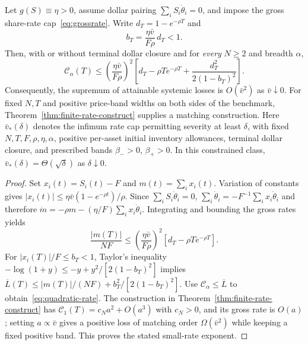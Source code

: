 \documentclass[review,hidelinks,onefignum,onetabnum]{siamonline250211}
\begin{document}
\begin{theorem}\label{thm:quadratic-rate}
Let $g(S)\equiv\eta>0$, assume dollar pairing $\sum_iS_i\dot\theta_i=0$, and impose the gross share-rate cap~\eqref{eq:grossrate}. Write $d_T=1-e^{-\rho T}$ and
\begin{equation}\label{eq:bsmall}
 b_T=\frac{\eta\bar v}{F\rho}\,d_T<1.
\end{equation}
Then, with or without terminal dollar closure and for \emph{every} $N\ge2$ and breadth $\alpha$,
\begin{equation}\label{eq:quadratic-rate}
\ \mathcal C_\alpha(T)\le
\left(\frac{\eta\bar v}{F\rho}\right)^2
\left[d_T-\rho T e^{-\rho T}
 +\frac{d_T^2}{2(1-b_T)^2}\right].\ 
\end{equation}
Consequently, the supremum of attainable systemic losses is $O(\bar v^2)$ as $\bar v\downarrow0$. For fixed $N,T$ and positive price-band widths on both sides of the benchmark, Theorem~\ref{thm:finite-rate-construct} supplies a matching construction. Here $\bar v_*(\delta)$ denotes the infimum rate cap permitting severity at least $\delta$, with fixed $N,T,F,\rho,\eta,\alpha$, positive per-asset initial inventory allowances, terminal dollar closure, and prescribed bands $\beta_->0$, $\beta_+>0$. In this constrained class, $\bar v_*(\delta)=\Theta(\sqrt\delta)$ as $\delta\downarrow0$.
\end{theorem}
\begin{proof}
Set $x_i(t)=S_i(t)-F$ and $m(t)=\sum_i x_i(t)$. Variation of constants gives
$|x_i(t)|\le\eta\bar v(1-e^{-\rho t})/\rho$. Since $\sum_iS_i\dot\theta_i=0$,
$\sum_i\dot\theta_i=-F^{-1}\sum_i x_i\dot\theta_i$ and therefore
$\dot m=-\rho m-(\eta/F)\sum_i x_i\dot\theta_i$. Integrating and bounding the gross rates yields
\begin{equation}\label{eq:meanprice}
\frac{|m(T)|}{NF}\le
\left(\frac{\eta\bar v}{F\rho}\right)^2
 [d_T-\rho T e^{-\rho T}].
\end{equation}
For $|x_i(T)|/F\le b_T<1$, Taylor's inequality
$-\log(1+y)\le-y+y^2/[2(1-b_T)^2]$ implies
$\overline L(T)\le |m(T)|/(NF)+b_T^2/[2(1-b_T)^2]$.
Use $\mathcal C_\alpha\le\overline L$ to obtain~\eqref{eq:quadratic-rate}. The construction in Theorem~\ref{thm:finite-rate-construct} has $\mathcal C_1(T)=c_Na^2+O(a^3)$ with $c_N>0$, and its gross rate is $O(a)$; setting $a\propto\bar v$ gives a positive loss of matching order $\Omega(\bar v^2)$ while keeping a fixed positive band. This proves the stated small-rate exponent.
\end{proof}
\end{document}
